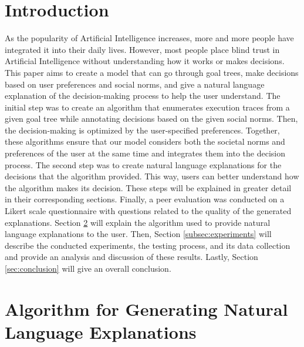 \documentclass[sigconf,nonacm]{acmart}
\begin{document}



\maketitle

\section{Introduction}
As the popularity of Artificial Intelligence increases, more and more people have integrated it into their daily lives. However, most people place blind trust in Artificial Intelligence without understanding how it works or makes decisions. This paper aims to create a model that can go through goal trees, make decisions based on user preferences and social norms, and give a natural language explanation of the decision-making process to help the user understand. The initial step was to create an algorithm that enumerates execution traces from a given goal tree while annotating decisions based on the given social norms. Then, the decision-making is optimized by the user-specified preferences. Together, these algorithms ensure that our model considers both the societal norms and preferences of the user at the same time and integrates them into the decision process. The second step was to create natural language explanations for the decisions that the algorithm provided. This way, users can better understand how the algorithm makes its decision. These steps will be explained in greater detail in their corresponding sections. Finally, a peer evaluation was conducted on a Likert scale questionnaire with questions related to the quality of the generated explanations.
Section \ref{sec:algorithm} will explain the algorithm used to provide natural language explanations to the user. Then, Section \ref{subsec:experiments} will describe the conducted experiments, the testing process, and its data collection and provide an analysis and discussion of these results. Lastly, Section \ref{sec:conclusion}
 will give an overall conclusion.

\section{Algorithm for Generating Natural Language Explanations} \label{sec:algorithm}
\end{document}
